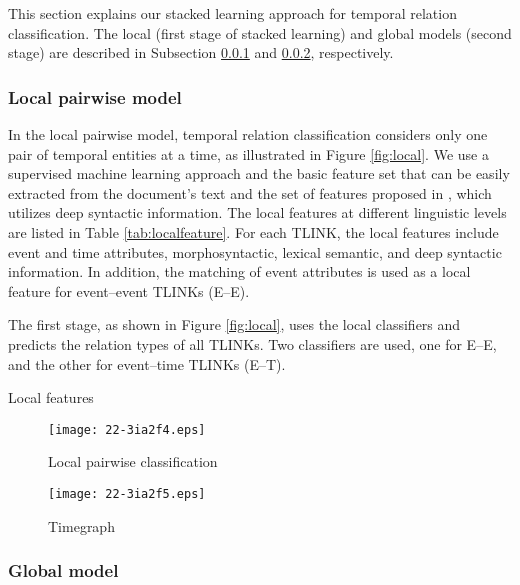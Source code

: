 \documentclass[english]{jnlp_1.4}
\begin{document}
This section explains our stacked learning approach for temporal relation classification.
The local (first stage of stacked learning) and global models (second stage) are described in Subsection \ref{subsubsec:localmodel} and \ref{subsubsec:globalmodel}, respectively.


\subsubsection{Local pairwise model}
\label{subsubsec:localmodel}

In the local pairwise model, temporal relation classification considers only one pair of temporal entities at a time, as illustrated in Figure \ref{fig:local}.
We use a supervised machine learning approach and the basic feature set that can be easily extracted from the document's text and the set of features proposed in , which utilizes deep syntactic information.
The local features at different linguistic levels are listed in Table \ref{tab:localfeature}.
For each TLINK, the local features include event and time attributes, morphosyntactic, lexical semantic, and deep syntactic information.
In addition, the matching of event attributes is used as a local feature for event--event TLINKs (E--E).

The first stage, as shown in Figure \ref{fig:local}, uses the local classifiers and predicts the relation types of all TLINKs.
Two classifiers are used, one for E--E, and the other for event--time TLINKs (E--T).

\begin{table}[t]
\caption{Local features}
\label{tab:localfeature}

\end{table}

\begin{figure}[t]
\begin{minipage}[b]{181pt}
\begin{center}
\texttt{[image: 22-3ia2f4.eps]}
\end{center}
\caption{Local pairwise classification}
\label{fig:local}
\end{minipage}
\hfill
\begin{minipage}[b]{157pt}
\begin{center}
\texttt{[image: 22-3ia2f5.eps]}
\end{center}
\caption{Timegraph}
\label{fig:timegraph}
\end{minipage}
\end{figure}


\subsubsection{Global model}
\label{subsubsec:globalmodel}
\end{document}
